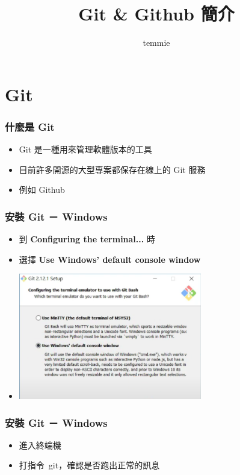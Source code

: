 \documentclass[mathserif]{beamer}
\title{Git \& Github 簡介}
\author{temmie}
\date{}
\begin{document}
\begin{frame}
    \titlepage
\end{frame}

\begin{frame}
    \tableofcontents
\end{frame}

\section{Git}

\begin{frame}
    \frametitle{什麼是 Git}
    \begin{itemize}
        \item Git 是一種用來管理軟體版本的工具
        \item 目前許多開源的大型專案都保存在線上的 Git 服務
        \item 例如 Github
    \end{itemize}
\end{frame}

\begin{frame}
    \frametitle{安裝 Git － Windows}
    \begin{itemize}
        \item 到 {\textbf{Configuring the terminal...}} 時
        \item 選擇 {\textbf{Use Windows' default console window}}
        \item \includegraphics[width=8.0cm]{img/download.jpg}
    \end{itemize}
\end{frame}

\begin{frame}
    \frametitle{安裝 Git － Windows}
    \begin{itemize}
        \item 進入終端機
        \item 打指令\ {\color{red}git}，確認是否跑出正常的訊息
    \end{itemize}
\end{frame}
\end{document}
